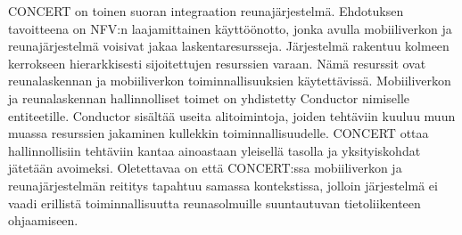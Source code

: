 CONCERT on toinen suoran integraation reunajärjestelmä. Ehdotuksen tavoitteena on NFV:n laajamittainen käyttöönotto, jonka avulla mobiiliverkon ja reunajärjestelmä voisivat jakaa laskentaresursseja. Järjestelmä rakentuu kolmeen kerrokseen hierarkkisesti sijoitettujen resurssien varaan. Nämä resurssit ovat reunalaskennan ja mobiiliverkon toiminnallisuuksien käytettävissä. 
Mobiiliverkon ja reunalaskennan hallinnolliset toimet on yhdistetty Conductor nimiselle entiteetille. Conductor sisältää useita alitoimintoja, joiden tehtäviin kuuluu muun muassa resurssien jakaminen kullekkin toiminnallisuudelle. CONCERT ottaa hallinnollisiin tehtäviin kantaa ainoastaan yleisellä tasolla ja yksityiskohdat jätetään avoimeksi. Oletettavaa on että CONCERT:ssa mobiiliverkon ja reunajärjestelmän reititys tapahtuu samassa kontekstissa, jolloin järjestelmä ei vaadi erillistä toiminnallisuutta reunasolmuille suuntautuvan tietoliikenteen ohjaamiseen. 

